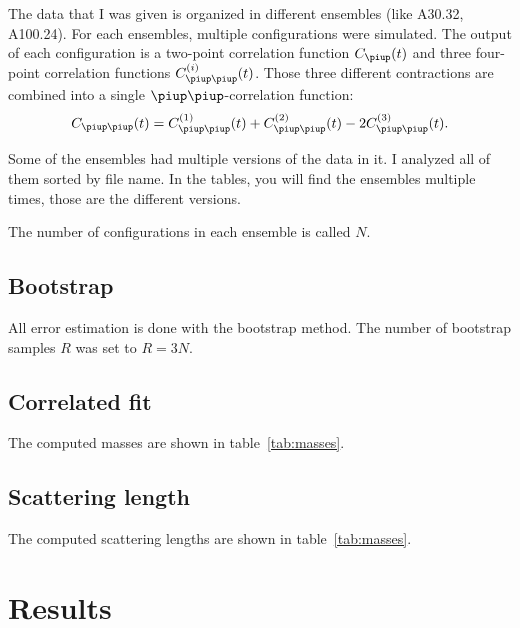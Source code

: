 \documentclass[11pt, english, fleqn, DIV=15, headinclude]{scrartcl}
\begin{document}
The data that I was given is organized in different ensembles (like A30.32,
A100.24). For each ensembles, multiple configurations were simulated. The
output of each configuration is a two-point correlation function $C_\piup(t)$
and three four-point correlation functions $C_{\piup\piup}^{(i)}(t)$. Those
three different contractions are combined into a single
$\piup\piup$-correlation function:
\[
    C_{\piup\piup}(t) = C_{\piup\piup}^{(1)}(t) + C_{\piup\piup}^{(2)}(t)
    - 2 C_{\piup\piup}^{(3)}(t).
\]

Some of the ensembles had multiple versions of the data in it. I analyzed all
of them sorted by file name. In the tables, you will find the ensembles
multiple times, those are the different versions.

The number of configurations in each ensemble is called $N$.


\subsection{Bootstrap}
\label{sec:bootstrap}

All error estimation is done with the bootstrap method. The number of bootstrap
samples $R$ was set to $R = 3N$.

\subsection{Correlated fit}
\label{sec:correlated_fit}

The computed masses are shown in table~\ref{tab:masses}.

\subsection{Scattering length}
\label{sec:scattering_length}

The computed scattering lengths are shown in table~\ref{tab:masses}.

\section{Results}
\label{sec:results}
\end{document}

